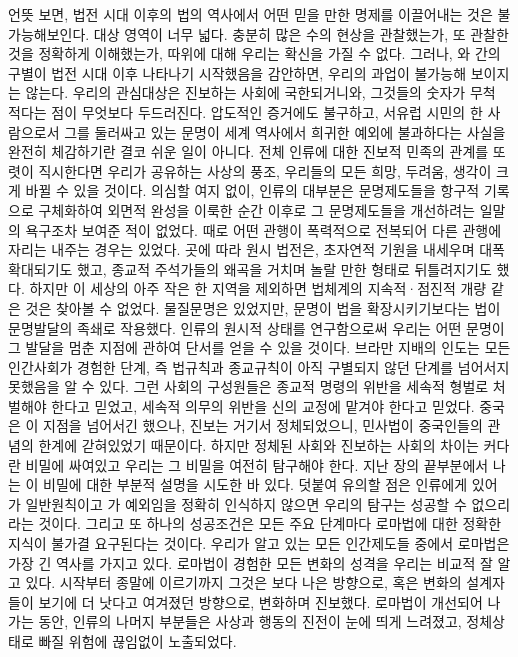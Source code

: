 언뜻 보면, 법전 시대 이후의 법의 역사에서 어떤 믿을 만한 명제를
이끌어내는 것은 불가능해보인다.
대상 영역이 너무 넓다.
충분히 많은 수의 현상을 관찰했는가,
또 관찰한 것을 정확하게 이해했는가, 따위에 대해 우리는 확신을 가질 수 없다.
그러나,
와
 간의 구별이
법전 시대 이후
나타나기 시작했음을
감안하면, 우리의 과업이 불가능해 보이지는 않는다.
우리의 관심대상은 진보하는 사회에 국한되거니와,
그것들의 숫자가 무척 적다는 점이 무엇보다 두드러진다.
압도적인 증거에도 불구하고, 서유럽 시민의 한 사람으로서
그를 둘러싸고 있는 문명이 세계 역사에서 희귀한 예외에 불과하다는 사실을
완전히 체감하기란 결코 쉬운 일이 아니다.
전체 인류에 대한 진보적 민족의 관계를 또렷이 직시한다면
우리가 공유하는 사상의 풍조, 우리들의 모든 희망, 두려움, 생각이
크게 바뀔 수 있을 것이다.
의심할 여지 없이, 인류의 대부분은
문명제도들을 항구적 기록으로 구체화하여 외면적 완성을 이룩한 순간 이후로
그 문명제도들을 개선하려는 일말의 욕구조차
보여준 적이 없었다.
때로 어떤 관행이 폭력적으로 전복되어 다른 관행에 자리는 내주는 경우는 있었다.
곳에 따라 원시 법전은,
초자연적 기원을 내세우며 대폭 확대되기도 했고,
종교적 주석가들의 왜곡을 거치며 놀랄 만한 형태로 뒤틀려지기도 했다.
하지만 이 세상의 아주 작은 한 지역을 제외하면
법체계의 지속적·점진적 개량 같은 것은 찾아볼 수 없었다.
물질문명은 있었지만, 문명이 법을 확장시키기보다는
법이 문명발달의 족쇄로 작용했다.
인류의 원시적 상태를 연구함으로써 우리는
어떤 문명이 그 발달을 멈춘 지점에 관하여 단서를 얻을 수 있을 것이다.
브라만 지배의 인도는 모든 인간사회가 경험한 단계, 즉
법규칙과 종교규칙이 아직 구별되지 않던 단계를 넘어서지 못했음을 알 수 있다.
그런 사회의 구성원들은 종교적 명령의 위반을 세속적 형벌로 처벌해야 한다고
믿었고, 세속적 의무의 위반을 신의 교정에 맡겨야 한다고 믿었다.
중국은 이 지점을 넘어서긴 했으나,
진보는 거기서 정체되었으니,
민사법이 중국인들의 관념의 한계에 갇혀있었기 때문이다.
하지만 정체된 사회와 진보하는 사회의 차이는
커다란 비밀에 싸여있고 우리는 그 비밀을 여전히 탐구해야 한다.
지난 장의 끝부분에서 나는 이 비밀에 대한 부분적 설명을 시도한 바 있다.
덧붙여 유의할 점은 인류에게 있어 가 일반원칙이고
가 예외임을 정확히 인식하지 않으면 우리의 탐구는
성공할 수 없으리라는 것이다.
그리고 또 하나의 성공조건은 모든 주요 단계마다 로마법에 대한 정확한 지식이
불가결 요구된다는 것이다.
우리가 알고 있는 모든 인간제도들 중에서 로마법은 가장 긴 역사를 가지고 있다.
로마법이 경험한 모든 변화의 성격을 우리는 비교적 잘 알고 있다.
시작부터 종말에 이르기까지 그것은 보다 나은 방향으로,
혹은 변화의 설계자들이 보기에 더 낫다고 여겨졌던 방향으로,
변화하며 진보했다.
로마법이 개선되어 나가는 동안,
인류의 나머지 부분들은 사상과 행동의 진전이 눈에 띄게 느려졌고,
정체상태로 빠질 위험에 끊임없이 노출되었다.

